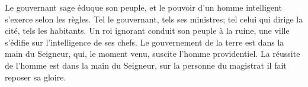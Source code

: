 Le gouvernant sage éduque son peuple,
	et le pouvoir d’un homme intelligent s’exerce selon les règles.
Tel le gouvernant, tels ses ministres;
	tel celui qui dirige la cité, tels les habitants.
Un roi ignorant conduit son peuple à la ruine,
	une ville s’édifie sur l’intelligence de ses chefs.
Le gouvernement de la terre est dans la main du Seigneur,
	qui, le moment venu, suscite l’homme providentiel.
La réussite de l’homme est dans la main du Seigneur,
	sur la personne du magistrat il fait reposer sa gloire.

